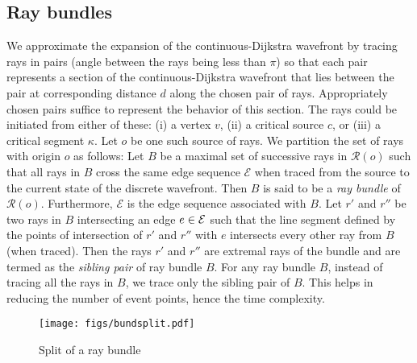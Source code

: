 \documentclass[11pt]{article}
\def\calE{\mathcal{E}}
\def\calR{\mathcal{R}}
\begin{document}
\subsection{Ray bundles}

We approximate the expansion of the continuous-Dijkstra wavefront by tracing rays in pairs (angle between the rays being less than $\pi$) so that each pair represents a section of the continuous-Dijkstra wavefront
that lies between the pair at corresponding distance $d$ along the chosen pair of rays.
Appropriately chosen  pairs suffice to represent the behavior of this section.
The rays could be initiated from either of these: (i) a vertex $v$, (ii) a critical source $c$, or (iii) a critical segment $\kappa$.
Let $o$ be one such source of rays.
We partition the set of rays with origin $o$ as follows: 
Let $B$ be a maximal set of successive rays in $\calR(o)$ such that all rays in $B$ cross the same edge sequence $\calE$ when traced from the source to  the current state of the discrete wavefront.
Then $B$ is said to be a {\it ray bundle} of $\calR(o)$.
Furthermore, $\calE$ is the edge sequence associated with $B$.
Let $r'$ and $r''$ be two rays in $B$ intersecting an edge $e \in {\cal E}$ such that the line segment defined by the points of intersection of $r'$ and $r''$ with $e$ intersects every other ray from $B$ (when traced).
Then the rays $r'$ and $r''$ are extremal rays of the bundle and are termed as the {\it sibling pair} of ray bundle $B$.
For any ray bundle $B$, instead of tracing all the rays in $B$, we trace only the sibling pair of $B$.
This helps in reducing the number of event points, hence the time complexity.

\begin{wrapfigure}{r}{0.5\textwidth}
\begin{minipage}[t]{\linewidth}
\vspace{-20pt}
\hspace{-10pt}
\begin{center}
\texttt{[image: figs/bundsplit.pdf]}
\end{center}
\vspace{-20pt}
\caption{\footnotesize Split of a ray bundle }
\label{fig:bundsplit}
\vspace{-10pt}
\end{minipage}
\end{wrapfigure}
\end{document}
